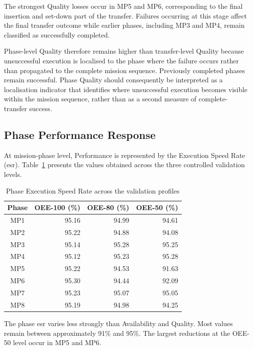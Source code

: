 The strongest Quality losses occur in MP5 and MP6, corresponding to the final insertion and set-down part of the transfer. Failures occurring at this stage affect the final transfer outcome while earlier phases, including MP3 and MP4, remain classified as successfully completed.

Phase-level Quality therefore remains higher than transfer-level Quality because unsuccessful execution is localised to the phase where the failure occurs rather than propagated to the complete mission sequence. Previously completed phases remain successful. Phase Quality should consequently be interpreted as a localisation indicator that identifies where unsuccessful execution becomes visible within the mission sequence, rather than as a second measure of complete-transfer success.






\subsection{Phase Performance Response}
\label{subsec:phase-performance-validation}
At mission-phase level, Performance is represented by the Execution Speed Rate (\acrshort{esr}). Table~\ref{tab:phase-esr-validation} presents the values obtained across the three controlled validation levels.

\begin{table}[H]
\small
\renewcommand{\arraystretch}{1.15}
\centering
\caption{Phase Execution Speed Rate across the validation profiles}
\label{tab:phase-esr-validation}
\begin{tabular}{|c|r|r|r|}
\hline
\textbf{Phase} &
\textbf{OEE-100 (\%)} &
\textbf{OEE-80 (\%)} &
\textbf{OEE-50 (\%)} \\
\hline
MP1 & 95.16 & 94.99 & 94.61 \\
MP2 & 95.22 & 94.88 & 94.08 \\
MP3 & 95.14 & 95.28 & 95.25 \\
MP4 & 95.12 & 95.23 & 95.28 \\
MP5 & 95.22 & 94.53 & 91.63 \\
MP6 & 95.30 & 94.44 & 92.09 \\
MP7 & 95.23 & 95.07 & 95.05 \\
MP8 & 95.19 & 94.98 & 94.25 \\
\hline
\end{tabular}
\end{table}

The phase \acrshort{esr} varies less strongly than Availability and Quality. Most values remain between approximately 91\% and 95\%. The largest reductions at the OEE-50 level occur in MP5 and MP6.

